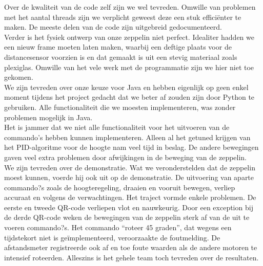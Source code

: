 \documentclass[eind]{penoverslag}
\begin{document}
Over de kwaliteit van de code zelf zijn we wel tevreden. Omwille van problemen met het aantal threads zijn we verplicht geweest deze een stuk effici\"enter te maken. De meeste delen van de code zijn uitgebreid gedocumenteerd. \\

Verder is het fysiek ontwerp van onze zeppelin niet perfect. Idealiter hadden we een nieuw frame moeten laten maken, waarbij een deftige plaats voor de distancesensor voorzien is en dat gemaakt is uit een stevig materiaal zoals plexiglas. Omwille van het vele werk met de programmatie zijn we hier niet toe gekomen. \\

We zijn tevreden over onze keuze voor Java en hebben eigenlijk op geen enkel moment tijdens het project gedacht dat we beter af zouden zijn door Python te gebruiken. Alle functionaliteit die we moesten implementeren, was zonder problemen mogelijk in Java. \\

Het is jammer dat we niet alle functionaliteit voor het uitvoeren van de commando's hebben kunnen implementeren. Alleen al het getuned krijgen van het PID-algoritme voor de hoogte nam veel tijd in beslag. De andere bewegingen gaven veel extra problemen door afwijkingen in de beweging van de zeppelin. \\

We zijn tevreden over de demonstratie. Wat we veronderstelden dat de zeppelin moest kunnen, voerde hij ook uit op de demonstratie. De uitvoering van aparte commando?s zoals de hoogteregeling, draaien en vooruit bewegen, verliep accuraat en volgens de verwachtingen. Het traject vormde enkele problemen. De eerste en tweede QR-code verliepen vlot en nauwkeurig. Door een exception bij de derde QR-code weken de bewegingen van de zeppelin sterk af van de uit te voeren commando?s. Het commando ``roteer 45 graden'', dat wegens een tijdstekort niet is ge\"implementeerd, veroorzaakte de foutmelding. De afstandsmeter registreerde ook af en toe foute waarden als de andere motoren te intensief roteerden. Alleszins is het gehele team toch tevreden over de resultaten.
\end{document}
